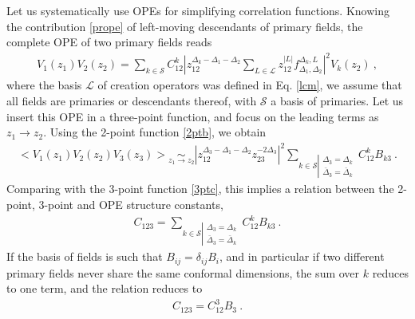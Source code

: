\documentclass[12pt, a4paper]{article}
\theoremstyle{break}
\begin{document}
Let us systematically use OPEs for simplifying correlation functions. Knowing the contribution \eqref{prope} of left-moving descendants of primary fields, the complete OPE of two primary fields reads 
\begin{align}
 V_1(z_1)V_2(z_2) = \sum_{k\in\mathcal{S}} C_{12}^k \left|z_{12}^{\Delta_k-\Delta_1-\Delta_2}\sum_{L\in\mathcal{L}} z_{12}^{|L|}f_{\Delta_1,\Delta_2}^{\Delta_k,L}\right|^2 V_k(z_2)\ ,
 \label{tope}
\end{align}
where the basis $\mathcal{L}$ of creation operators was defined in Eq. \eqref{lcm},
we assume that all fields are primaries or descendants thereof, with $\mathcal{S}$ a basis of primaries. Let us insert this OPE in a three-point function, and focus on the leading terms as $z_1\to z_2$. Using the 2-point function \eqref{2ptb}, we obtain
\begin{align}
  \Big< V_1(z_1)V_2(z_2)V_3(z_3) \Big> \underset{z_1\to z_2}{\sim} 
  \left|z_{12}^{\Delta_3-\Delta_1-\Delta_2}z_{23}^{-2\Delta_3}\right|^2 
  \sum_{k\in\mathcal{S}\left|\substack{\Delta_3=\Delta_k\\ \bar{\Delta}_3=\bar\Delta_k}\right. }
  C_{12}^k B_{k3}\ .
\end{align}
Comparing with the 3-point function \eqref{3ptc}, this implies a relation between the 2-point, 3-point and OPE structure constants, 
\begin{align}
 C_{123} = \sum_{k\in\mathcal{S}\left|\substack{\Delta_3=\Delta_k\\ \bar{\Delta}_3=\bar\Delta_k}\right. } C_{12}^k B_{k3}\ .
\end{align}
If the basis of fields is such that $B_{ij}=\delta_{ij}B_i$, and in particular if two different primary fields never share the same conformal dimensions, the sum over $k$ reduces to one term, and the relation reduces to
\begin{align}
 \boxed{C_{123} = C_{12}^3B_{3}} \ .
 \label{ccb}
\end{align}
\end{document}
